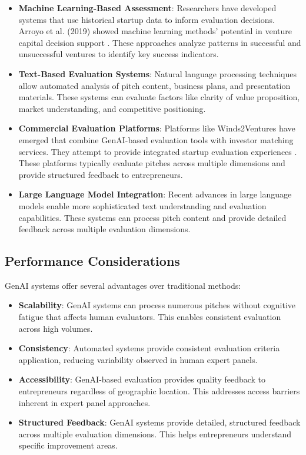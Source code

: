 \begin{itemize}
    \item \textbf{Machine Learning-Based Assessment}: Researchers have developed systems that use historical startup data to inform evaluation decisions. Arroyo et al. (2019) showed machine learning methods' potential in venture capital decision support \cite{Arroyo2019}. These approaches analyze patterns in successful and unsuccessful ventures to identify key success indicators.

    \item \textbf{Text-Based Evaluation Systems}: Natural language processing techniques allow automated analysis of pitch content, business plans, and presentation materials. These systems can evaluate factors like clarity of value proposition, market understanding, and competitive positioning.

    \item \textbf{Commercial Evaluation Platforms}: Platforms like Winds2Ventures have emerged that combine GenAI-based evaluation tools with investor matching services. They attempt to provide integrated startup evaluation experiences \cite{w2v}. These platforms typically evaluate pitches across multiple dimensions and provide structured feedback to entrepreneurs.

    \item \textbf{Large Language Model Integration}: Recent advances in large language models enable more sophisticated text understanding and evaluation capabilities. These systems can process pitch content and provide detailed feedback across multiple evaluation dimensions.
\end{itemize}

\subsection{Performance Considerations}\label{subsec:performance-considerations}
GenAI systems offer several advantages over traditional methods:

\begin{itemize}
    \item \textbf{Scalability}: GenAI systems can process numerous pitches without cognitive fatigue that affects human evaluators. This enables consistent evaluation across high volumes.

    \item \textbf{Consistency}: Automated systems provide consistent evaluation criteria application, reducing variability observed in human expert panels.

    \item \textbf{Accessibility}: GenAI-based evaluation provides quality feedback to entrepreneurs regardless of geographic location. This addresses access barriers inherent in expert panel approaches.

    \item \textbf{Structured Feedback}: GenAI systems provide detailed, structured feedback across multiple evaluation dimensions. This helps entrepreneurs understand specific improvement areas.
\end{itemize}

